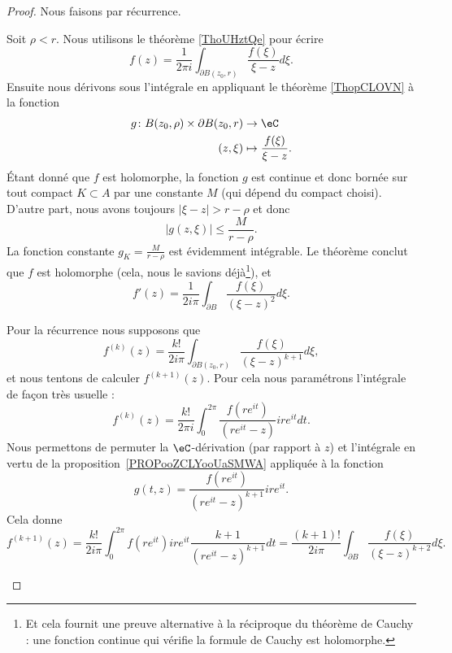 \begin{proof}
	Nous faisons par récurrence.
	\begin{subproof}
		Soit \( \rho<r\). Nous utilisons le théorème \ref{ThoUHztQe} pour écrire
		\begin{equation}
			f(z)=\frac{1}{ 2\pi i}\int_{\partial B(z_0,r)}\frac{ f(\xi) }{ \xi-z }d\xi.
		\end{equation}
		Ensuite nous dérivons sous l'intégrale en appliquant le théorème \ref{ThopCLOVN} à la fonction
		\begin{equation}
			\begin{aligned}
				g\colon B(z_0,\rho)\times \partial B(z_0,r) & \to \eC                           \\
				(z,\xi)                                     & \mapsto \frac{ f(\xi) }{ \xi-z }.
			\end{aligned}
		\end{equation}
		Étant donné que \( f\) est holomorphe, la fonction \( g\) est continue et donc bornée sur tout compact \( K\subset A\) par une constante \( M\) (qui dépend du compact choisi).  D'autre part, nous avons toujours \( | \xi-z |>r-\rho\) et donc
		\begin{equation}
			| g(z,\xi) |\leq \frac{ M }{ r-\rho }.
		\end{equation}
		La fonction constante \( g_K=\frac{ M }{ r-\rho }\) est évidemment intégrable. Le théorème conclut que \( f\) est holomorphe (cela, nous le savions déjà\footnote{Et cela fournit une preuve alternative à la réciproque du théorème de Cauchy : une fonction continue qui vérifie la formule de Cauchy est holomorphe.}), et
		\begin{equation}
			f'(z)=\frac{1}{ 2i\pi }\int_{\partial B}\frac{ f(\xi) }{ (\xi-z)^2 }d\xi.
		\end{equation}

		Pour la récurrence\cite{ooKZJHooZhNpkf} nous supposons que
		\begin{equation}
			f^{(k)}(z)=\frac{k!}{ 2i\pi }\int_{\partial B(z_0,r)}\frac{ f(\xi) }{ (\xi-z)^{k+1} }d\xi,
		\end{equation}
		et nous tentons de calculer \( f^{(k+1)}(z)\). Pour cela nous paramétrons l'intégrale de façon très usuelle :
		\begin{equation}
			f^{(k)}(z)=\frac{ k! }{ 2\pi i }\int_0^{2\pi}\frac{ f(r e^{it}) }{ (r e^{it}-z) }ir e^{it}dt.
		\end{equation}
		Nous permettons de permuter la \( \eC\)-dérivation (par rapport à \( z\)) et l'intégrale en vertu de la proposition~\ref{PROPooZCLYooUaSMWA} appliquée à la fonction
		\begin{equation}
			g(t,z)=\frac{ f(r e^{it}) }{ (r e^{it}-z)^{k+1} }ir e^{it}.
		\end{equation}
		Cela donne
		\begin{equation}
			f^{(k+1)}(z)=\frac{ k! }{ 2i\pi }\int_0^{2\pi}f(r e^{it})ir e^{it}\frac{ k+1 }{ (r e^{it}-z)^{k+1} }dt=\frac{ (k+1)! }{ 2i\pi }\int_{\partial B}\frac{ f(\xi) }{ (\xi-z)^{k+2} }d\xi.
		\end{equation}
	\end{subproof}
\end{proof}

